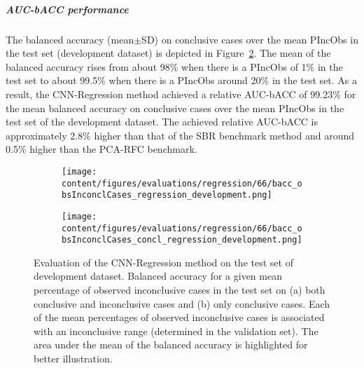 \subparagraph{AUC-bACC performance}

The balanced accuracy (mean$\pm$SD) on conclusive cases over the mean PIncObs in the test set (development dataset) 
is depicted in Figure~\ref{fig:bacc_obsInconclCases_concl_regression_development}.
The mean of the balanced accuracy rises from about 98\% when there is a PIncObs of 1\% in the test set 
to about 99.5\% when there is a PIncObs around 20\% in the test set.
As a result, the CNN-Regression method achieved a relative AUC-bACC of 99.23\% for the mean balanced accuracy on conclusive cases
over the mean PIncObs in the test set of the development dataset.
The achieved relative AUC-bACC is approximately 2.8\% higher than that of the SBR benchmark method 
and around 0.5\% higher than the PCA-RFC benchmark.


\begin{figure}[ht]
  \begin{subfigure}{0.5\textwidth}
    \centering
    \texttt{[image: content/figures/evaluations/regression/66/bacc\_obsInconclCases\_regression\_development.png]}
    \subcaption{}
    \label{fig:bacc_obsInconclCases_regression_development}
  \end{subfigure}
  \hfill
  \begin{subfigure}{0.5\textwidth}
    \centering
    \texttt{[image: content/figures/evaluations/regression/66/bacc\_obsInconclCases\_concl\_regression\_development.png]}
    \subcaption{}
    \label{fig:bacc_obsInconclCases_concl_regression_development}
  \end{subfigure}

  \caption{Evaluation of the CNN-Regression method on the test set of development dataset.
  Balanced accuracy for a given mean percentage of observed inconclusive cases in the test set on 
  (a) both conclusive and inconclusive cases and (b) only conclusive cases. 
  Each of the mean percentages of observed inconclusive cases is associated with an inconclusive range (determined in the validation set). 
  The area under the mean of the balanced accuracy is highlighted for better illustration.}
  \label{fig:bacc_obsInconclCases_regression_development_full}
\end{figure}



